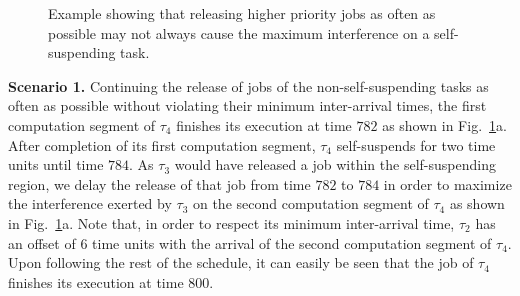 \begin{figure}[t]
{{} }
\caption{Example showing that releasing higher priority jobs as often as possible may not always cause the maximum interference on a self-suspending task.}
\label{fig:ex_crit_inst2}
\end{figure}

\noindent\textbf{Scenario 1.} Continuing the release of jobs of the non-self-suspending tasks as often as possible without violating their minimum inter-arrival times, the first computation segment of $\tau_4$ finishes its execution at time $782$ as shown in Fig.~\ref{fig:ex_crit_inst2}a. After completion of its first computation segment, $\tau_4$ self-suspends for two time units until time $784$. As $\tau_3$ would have released a job within the self-suspending region, we delay the release of that job from time $782$ to $784$ in order to maximize the interference exerted by $\tau_3$ on the second computation segment of $\tau_4$ as shown in Fig.~\ref{fig:ex_crit_inst2}a. Note that, in order to respect its minimum inter-arrival time, $\tau_2$ has an offset of $6$ time units with the arrival of the second computation segment of $\tau_4$. Upon following the rest of the schedule, it can easily be seen that the job of $\tau_4$ finishes its execution at time $800$.

